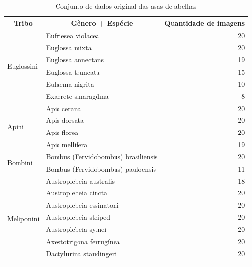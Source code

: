 \documentclass[
	12pt,				%
	oneside,			%
	a4paper,			%
	english,			%
	brazil				%
	]{abntex2ppgsi}
\begin{document}
\begin{longtable}[c]{|l|l|r|}
\caption{Conjunto de dados original das asas de abelhas}
\label{tab:conjunto_dados_abelhas}\\
\hline
\multicolumn{1}{|c|}{Tribo}  & \multicolumn{1}{c|}{Gênero + Espécie}                & \multicolumn{1}{c|}{Quantidade de imagens} \\ \hline
\endfirsthead
%
\endhead
%
\multirow{6}{*}{Euglossini} 
                       & Eufriesea violacea  & 20 \\ \cline{2-3} 
                       & Euglossa mixta      & 20 \\ \cline{2-3} 
                       & Euglossa annectans  & 19 \\ \cline{2-3} 
                       & Euglossa truncata   & 15 \\ \cline{2-3} 
                       & Eulaema nigrita     & 10 \\ \cline{2-3} 
                       & Exaerete smaragdina & 8  \\ \hline
\multirow{4}{*}{Apini} & Apis cerana         & 20 \\ \cline{2-3} 
                       & Apis dorsata        & 20 \\ \cline{2-3} 
                       & Apis florea         & 20 \\ \cline{2-3} 
                       & Apis mellifera      & 19 \\ \hline
\multirow{2}{*}{Bombini}     
                       & Bombus (Fervidobombus) brasiliensis & 20 \\ \cline{2-3} 
                       & Bombus (Fervidobombus) pauloensis   & 11 \\ \hline
\multirow{33}{*}{Meliponini} 
                       & Austroplebeia australis            & 18 \\ \cline{2-3} 
                       & Austroplebeia cincta               & 20 \\ \cline{2-3} 
                       & Austroplebeia essinatoni           & 20 \\ \cline{2-3} 
                       & Austroplebeia striped              & 20 \\ \cline{2-3} 
                       & Austroplebeia symei                & 20 \\ \cline{2-3} 
                       & Axestotrigona ferrugínea           & 20 \\ \cline{2-3} 
                       & Dactylurina staudingeri            & 20 \\ \cline{2-3} 

\end{longtable}
\end{document}
